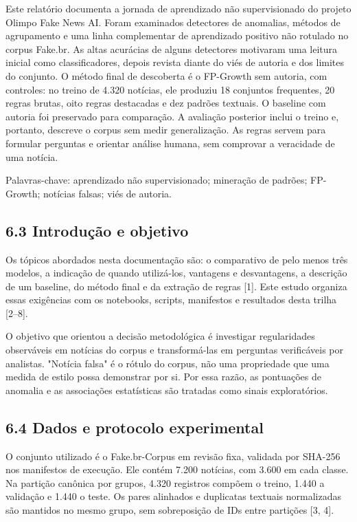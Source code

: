 \documentclass[
  brazilian,
  11pt,
]{article}
\begin{document}
Este relatório documenta a jornada de aprendizado não supervisionado do projeto Olimpo Fake News AI. Foram examinados detectores de anomalias, métodos de agrupamento e uma linha complementar de aprendizado positivo não rotulado no corpus Fake.br. As altas acurácias de alguns detectores motivaram uma leitura inicial como classificadores, depois revista diante do viés de autoria e dos limites do conjunto. O método final de descoberta é o FP-Growth sem autoria, com controles: no treino de 4.320 notícias, ele produziu 18 conjuntos frequentes, 20 regras brutas, oito regras destacadas e dez padrões textuais. O baseline com autoria foi preservado para comparação. A avaliação posterior inclui o treino e, portanto, descreve o corpus sem medir generalização. As regras servem para formular perguntas e orientar análise humana, sem comprovar a veracidade de uma notícia.

Palavras-chave: aprendizado não supervisionado; mineração de padrões; FP-Growth; notícias falsas; viés de autoria.

\subsection{6.3 Introdução e objetivo}\label{introduuxe7uxe3o-e-objetivo}

Os tópicos abordados nesta documentação são: o comparativo de pelo menos três modelos, a indicação de quando utilizá-los, vantagens e desvantagens, a descrição de um baseline, do método final e da extração de regras {[}1{]}. Este estudo organiza essas exigências com os notebooks, scripts, manifestos e resultados desta trilha {[}2--8{]}.

O objetivo que orientou a decisão metodológica é investigar regularidades observáveis em notícias do corpus e transformá-las em perguntas verificáveis por analistas. "Notícia falsa" é o rótulo do corpus, não uma propriedade que uma medida de estilo possa demonstrar por si. Por essa razão, as pontuações de anomalia e as associações estatísticas são tratadas como sinais exploratórios.

\subsection{6.4 Dados e protocolo experimental}\label{dados-e-protocolo-experimental}

O conjunto utilizado é o Fake.br-Corpus em revisão fixa, validada por SHA-256 nos manifestos de execução. Ele contém 7.200 notícias, com 3.600 em cada classe. Na partição canônica por grupos, 4.320 registros compõem o treino, 1.440 a validação e 1.440 o teste. Os pares alinhados e duplicatas textuais normalizadas são mantidos no mesmo grupo, sem sobreposição de IDs entre partições {[}3, 4{]}.
\end{document}
